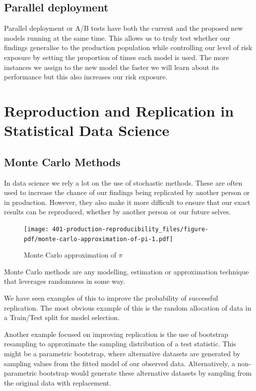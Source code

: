 \documentclass[
  letterpaper,
  DIV=11,
  numbers=noendperiod]{scrreprt}
\begin{document}
\subsection{Parallel deployment}\label{parallel-deployment}

Parallel deployment or A/B tests have both the current and the proposed
new models running at the same time. This allows us to truly test
whether our findings generalise to the production population while
controlling our level of risk exposure by setting the proportion of
times each model is used. The more instances we assign to the new model
the faster we will learn about its performance but this also increases
our risk exposure.

\section{Reproduction and Replication in Statistical Data
Science}\label{reproduction-and-replication-in-statistical-data-science}

\subsection{Monte Carlo Methods}\label{monte-carlo-methods}

In data science we rely a lot on the use of stochastic methods. These
are often used to increase the chance of our findings being replicated
by another person or in production. However, they also make it more
difficult to ensure that our exact results can be reproduced, whether by
another person or our future selves.

\begin{figure}[H]

{\centering \texttt{[image: 401-production-reproducibility\_files/figure-pdf/monte-carlo-approximation-of-pi-1.pdf]}

}

\caption{Monte Carlo approximation of \(\pi\)}

\end{figure}%

Monte Carlo methods are any modelling, estimation or approximation
technique that leverages randomness in some way.

We have seen examples of this to improve the probability of successful
replication. The most obvious example of this is the random allocation
of data in a Train/Test split for model selection.

Another example focused on improving replication is the use of bootstrap
resampling to approximate the sampling distribution of a test statistic.
This might be a parametric bootstrap, where alternative datasets are
generated by sampling values from the fitted model of our observed data.
Alternatively, a non-parametric bootstrap would generate these
alternative datasets by sampling from the original data with
replacement.
\end{document}
